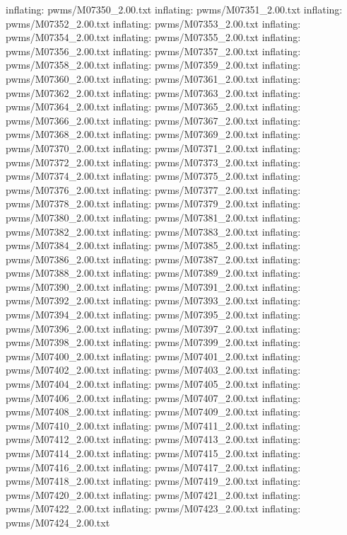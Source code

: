 \documentclass[letterpaper,10pt,english]{sphinxmanual}
\begin{document}
{\begin{sphinxVerbatim}[commandchars=\\\{\}]
  inflating: pwms/M07350\_2.00.txt
  inflating: pwms/M07351\_2.00.txt
  inflating: pwms/M07352\_2.00.txt
  inflating: pwms/M07353\_2.00.txt
  inflating: pwms/M07354\_2.00.txt
  inflating: pwms/M07355\_2.00.txt
  inflating: pwms/M07356\_2.00.txt
  inflating: pwms/M07357\_2.00.txt
  inflating: pwms/M07358\_2.00.txt
  inflating: pwms/M07359\_2.00.txt
  inflating: pwms/M07360\_2.00.txt
  inflating: pwms/M07361\_2.00.txt
  inflating: pwms/M07362\_2.00.txt
  inflating: pwms/M07363\_2.00.txt
  inflating: pwms/M07364\_2.00.txt
  inflating: pwms/M07365\_2.00.txt
  inflating: pwms/M07366\_2.00.txt
  inflating: pwms/M07367\_2.00.txt
  inflating: pwms/M07368\_2.00.txt
  inflating: pwms/M07369\_2.00.txt
  inflating: pwms/M07370\_2.00.txt
  inflating: pwms/M07371\_2.00.txt
  inflating: pwms/M07372\_2.00.txt
  inflating: pwms/M07373\_2.00.txt
  inflating: pwms/M07374\_2.00.txt
  inflating: pwms/M07375\_2.00.txt
  inflating: pwms/M07376\_2.00.txt
  inflating: pwms/M07377\_2.00.txt
  inflating: pwms/M07378\_2.00.txt
  inflating: pwms/M07379\_2.00.txt
  inflating: pwms/M07380\_2.00.txt
  inflating: pwms/M07381\_2.00.txt
  inflating: pwms/M07382\_2.00.txt
  inflating: pwms/M07383\_2.00.txt
  inflating: pwms/M07384\_2.00.txt
  inflating: pwms/M07385\_2.00.txt
  inflating: pwms/M07386\_2.00.txt
  inflating: pwms/M07387\_2.00.txt
  inflating: pwms/M07388\_2.00.txt
  inflating: pwms/M07389\_2.00.txt
  inflating: pwms/M07390\_2.00.txt
  inflating: pwms/M07391\_2.00.txt
  inflating: pwms/M07392\_2.00.txt
  inflating: pwms/M07393\_2.00.txt
  inflating: pwms/M07394\_2.00.txt
  inflating: pwms/M07395\_2.00.txt
  inflating: pwms/M07396\_2.00.txt
  inflating: pwms/M07397\_2.00.txt
  inflating: pwms/M07398\_2.00.txt
  inflating: pwms/M07399\_2.00.txt
  inflating: pwms/M07400\_2.00.txt
  inflating: pwms/M07401\_2.00.txt
  inflating: pwms/M07402\_2.00.txt
  inflating: pwms/M07403\_2.00.txt
  inflating: pwms/M07404\_2.00.txt
  inflating: pwms/M07405\_2.00.txt
  inflating: pwms/M07406\_2.00.txt
  inflating: pwms/M07407\_2.00.txt
  inflating: pwms/M07408\_2.00.txt
  inflating: pwms/M07409\_2.00.txt
  inflating: pwms/M07410\_2.00.txt
  inflating: pwms/M07411\_2.00.txt
  inflating: pwms/M07412\_2.00.txt
  inflating: pwms/M07413\_2.00.txt
  inflating: pwms/M07414\_2.00.txt
  inflating: pwms/M07415\_2.00.txt
  inflating: pwms/M07416\_2.00.txt
  inflating: pwms/M07417\_2.00.txt
  inflating: pwms/M07418\_2.00.txt
  inflating: pwms/M07419\_2.00.txt
  inflating: pwms/M07420\_2.00.txt
  inflating: pwms/M07421\_2.00.txt
  inflating: pwms/M07422\_2.00.txt
  inflating: pwms/M07423\_2.00.txt
  inflating: pwms/M07424\_2.00.txt

\end{sphinxVerbatim}}
\end{document}
